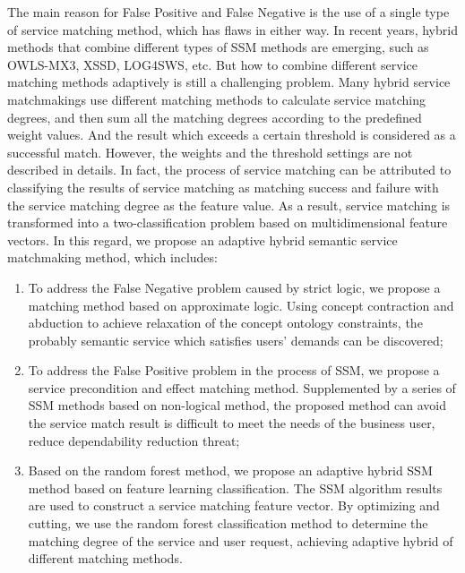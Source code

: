 \documentclass{ieeeaccess}
\begin{document}
The main reason for False Positive and False Negative is the use of a single type of service matching method, which has flaws in either way. In recent years, hybrid methods that combine different types of SSM methods are emerging, such as OWLS-MX3, XSSD, LOG4SWS, etc. But how to combine different service matching methods adaptively is still a challenging problem. Many hybrid service matchmakings use different matching methods to calculate service matching degrees, and then sum all the matching degrees according to the predefined weight values. And the result which exceeds a certain threshold is considered as a successful match. However, the weights and the threshold settings are not described in details. In fact, the process of service matching can be attributed to classifying the results of service matching as matching success and failure with the service matching degree as the feature value. As a result, service matching is transformed into a two-classification problem based on multidimensional feature vectors. In this regard, we propose an adaptive hybrid semantic service matchmaking method, which includes:
\begin{enumerate}
\item To address the False Negative problem caused by strict logic, we propose a matching method based on approximate logic. Using concept contraction and abduction to achieve relaxation of the concept ontology constraints, the probably semantic service which satisfies users' demands can be discovered;
\item To address the False Positive problem in the process of SSM, we propose a service precondition and effect matching method. Supplemented by a series of SSM methods based on non-logical method, the proposed method can avoid the service match result is difficult to meet the needs of the business user, reduce dependability reduction threat;
\item Based on the random forest method, we propose an adaptive hybrid SSM method based on feature learning classification. The SSM algorithm results are used to construct a service matching feature vector. By optimizing and cutting, we use the random forest classification method to determine the matching degree of the service and user request, achieving adaptive hybrid of different matching methods.
\end{enumerate}
\end{document}
